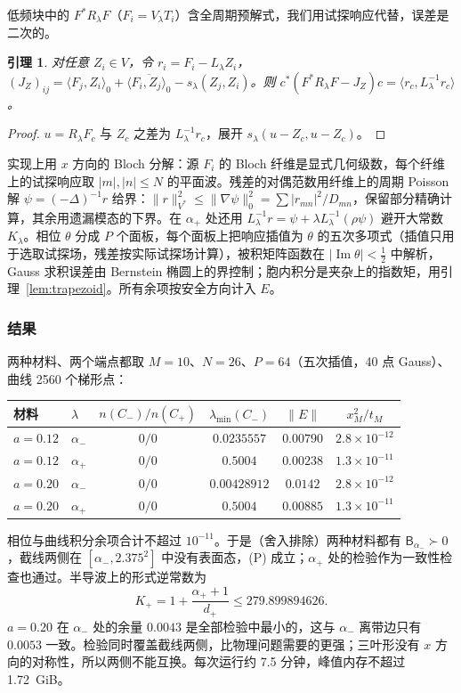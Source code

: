 \documentclass[11pt,a4paper,fontset=fandol]{ctexart}
\theoremstyle{plain}
\newtheorem{lemma}[theorem]{引理}
\theoremstyle{definition}
\theoremstyle{remark}
\begin{document}
低频块中的 $F^*R_\lambda F$（$F_i=V_\lambda T_i$）含全周期预解式，我们用试探响应代替，误差是二次的。

\begin{lemma}
\label{lem:quad-residual}
对任意 $Z_i\in V$，令 $r_i=F_i-L_\lambda Z_i$，$(J_Z)_{ij}=\langle F_j,Z_i\rangle_0+\overline{\langle F_i,Z_j\rangle_0}-s_\lambda(Z_j,Z_i)$。则 $c^*(F^*R_\lambda F-J_Z)c=\langle r_c,L_\lambda^{-1}r_c\rangle$。
\end{lemma}

\begin{proof}
$u=R_\lambda F_c$ 与 $Z_c$ 之差为 $L_\lambda^{-1}r_c$，展开 $s_\lambda(u-Z_c,u-Z_c)$。
\end{proof}

实现上用 $x$ 方向的 Bloch 分解：源 $F_i$ 的 Bloch 纤维是显式几何级数，每个纤维上的试探响应取 $|m|,|n|\le N$ 的平面波。残差的对偶范数用纤维上的周期 Poisson 解 $\psi=(-\Delta)^{-1}r$ 给界：$\|r\|_{V^*}^2\le\|\nabla\psi\|_0^2=\sum|r_{mn}|^2/D_{mn}$，保留部分精确计算，其余用遗漏模态的下界。在 $\alpha_+$ 处还用 $L_\lambda^{-1}r=\psi+\lambda L_\lambda^{-1}(\rho\psi)$ 避开大常数 $K_\lambda$。相位 $\theta$ 分成 $P$ 个面板，每个面板上把响应插值为 $\theta$ 的五次多项式（插值只用于选取试探场，残差按实际试探场计算），被积矩阵函数在 $|\operatorname{Im}\theta|<\frac12$ 中解析，Gauss 求积误差由 Bernstein 椭圆上的界控制；胞内积分是夹杂上的指数矩，用引理~\ref{lem:trapezoid}。所有余项按安全方向计入 $E$。

\subsubsection{结果}

两种材料、两个端点都取 $M=10$、$N=26$、$P=64$（五次插值，40 点 Gauss）、曲线 2560 个梯形点：
\begin{center}
\small
\begin{tabular}{llcccc}
\toprule
材料 & $\lambda$ & $n(C_-)/n(C_+)$ & $\lambda_{\min}(C_-)$ & $\|E\|$ & $x_M^2/t_M$ \\
\midrule
$a=0.12$ & $\alpha_-$ & $0/0$ & $0.0235557$ & $0.00790$ & $2.8\times10^{-12}$ \\
$a=0.12$ & $\alpha_+$ & $0/0$ & $0.5004$ & $0.00238$ & $1.3\times10^{-11}$ \\
$a=0.20$ & $\alpha_-$ & $0/0$ & $0.00428912$ & $0.0142$ & $2.8\times10^{-12}$ \\
$a=0.20$ & $\alpha_+$ & $0/0$ & $0.5004$ & $0.00885$ & $1.3\times10^{-11}$ \\
\bottomrule
\end{tabular}
\end{center}
相位与曲线积分余项合计不超过 $10^{-11}$。于是（舍入排除）两种材料都有 $\mathsf B_{\alpha_-}\succ0$，截线两侧在 $[\alpha_-,2.375^2]$ 中没有表面态，(P) 成立；$\alpha_+$ 处的检验作为一致性检查也通过。半导波上的形式逆常数为
\[
K_+=1+\frac{\alpha_++1}{d_+}\le279.899894626 .
\]
$a=0.20$ 在 $\alpha_-$ 处的余量 $0.0043$ 是全部检验中最小的，这与 $\alpha_-$ 离带边只有 $0.0053$ 一致。检验同时覆盖截线两侧，比物理问题需要的更强；三叶形没有 $x$ 方向的对称性，所以两侧不能互换。每次运行约 7.5 分钟，峰值内存不超过 1.72~GiB。
\end{document}
